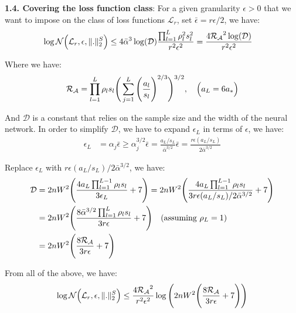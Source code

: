 \noindent\newline\textbf{1.4. Covering the loss function class}: For a given granularity $\epsilon>0$ that we want to impose on the class of loss functions $\mathcal{L}_r$, set $\bar\epsilon=r\epsilon/2$, we have:
\begin{align*}
    \log\mathcal{N}\Big( 
        \mathcal{L}_r, \epsilon, \|.\|_2^S
     \Big) &\le 4\bar\alpha^3\log(\mathcal{D})\frac{\prod_{l=1}^L\rho_l^2s_l^2}{r^2\epsilon^2} = \frac{4\mathcal{R_A}^2\log(\mathcal{D})}{r^2\epsilon^2}
\end{align*}

\noindent Where we have:
\begin{align*}
    \mathcal{R_A} = \prod_{l=1}^L\rho_ls_l \Bigg( 
        \sum_{j=1}^L \Bigg( 
            \frac{a_l}{s_l}
         \Bigg)^{2/3}
     \Bigg)^{3/2}, \ \ \ \Big( a_L = 6a_* \Big)
\end{align*}

\noindent And $\mathcal{D}$ is a constant that relies on the sample size and the width of the neural network. In order to simplify $\mathcal{D}$, we have to expand $\epsilon_L$ in terms of $\epsilon$, we have:
\begin{align*}
    \epsilon_L &= \alpha_j \bar\epsilon \ge \alpha_j^{3/2}\bar\epsilon = \frac{a_L/s_L}{\bar\alpha^{3/2}}\bar\epsilon = \frac{r\epsilon(a_L/s_L)}{2\bar\alpha^{3/2}} 
\end{align*}

\noindent Replace $\epsilon_L$ with ${r\epsilon(a_L/s_L)}/{2\bar\alpha^{3/2}}$, we have:
\begin{align*}
    \mathcal{D} &= 2nW^2\Bigg( 
        \frac{4a_L\prod_{l=1}^{L-1}\rho_ls_l}{3\epsilon_L} + 7
     \Bigg) = 2nW^2\Bigg( 
        \frac{4a_L\prod_{l=1}^{L-1}\rho_ls_l}{3r\epsilon(a_L/s_L)/2\bar\alpha^{3/2}} + 7
     \Bigg) \\
    &= 2nW^2\Bigg( 
        \frac{8\bar\alpha^{3/2}\prod_{l=1}^L \rho_ls_l}{3r\epsilon} + 7
     \Bigg) \ \ \ (\text{assuming } \rho_L=1) \\
    &= 2nW^2\Bigg( 
        \frac{8\mathcal{R_A}}{3r\epsilon} + 7
     \Bigg)
\end{align*}

\noindent From all of the above, we have:
\begin{align*}
    \log\mathcal{N}\Big( \mathcal{L}_r, \epsilon, \|.\|_2^S \Big) \le \frac{4\mathcal{R_A}^2}{r^2\epsilon^2}\log\Bigg( 
        2nW^2\Bigg( 
            \frac{8\mathcal{R_A}}{3r\epsilon} + 7
         \Bigg)
     \Bigg)
\end{align*}

